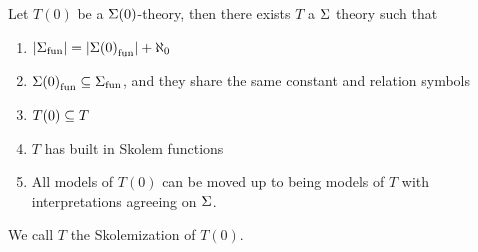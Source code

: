 \begin{prop}[Skolemization]
    Let $T(0)$ be a $\Sigma(0)$-theory, 
    then there exists $T$ a $\Sigma$ theory such that
    \begin{enumerate}
        \item $|{\Sigma}_\mathrm{fun}| = |{\Sigma(0)}_\mathrm{fun}| + \aleph_0$
        \item ${\Sigma(0)}_\mathrm{fun} \subseteq {\Sigma}_\mathrm{fun}$, 
            and they share the same constant and relation symbols
        \item $T(0) \subseteq T$
        \item $T$ has built in Skolem functions
        \item All models of $T(0)$ can be moved up to being models of $T$ 
            with interpretations agreeing on $\Sigma$.
    \end{enumerate} 
    We call $T$ the Skolemization of $T(0)$.
\end{prop}
